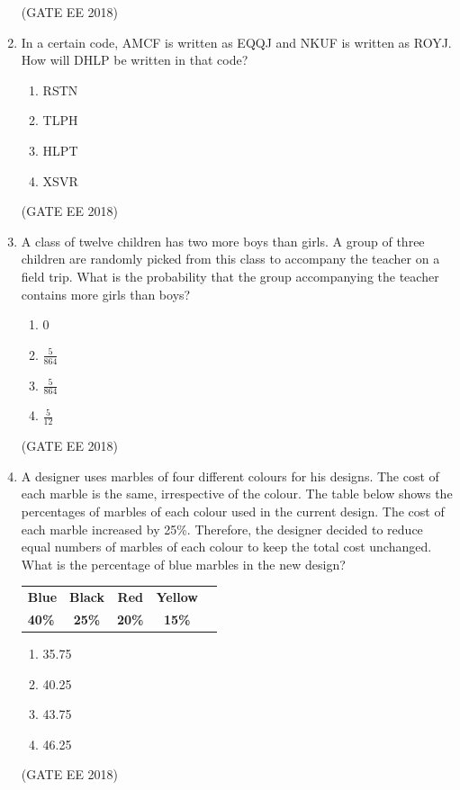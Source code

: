 \documentclass[journal,12pt,onecolumn]{IEEEtran}
\theoremstyle{remark}
\begin{document}
\begin{enumerate}
    \hfill{(GATE EE 2018)}
    \item In a certain code, AMCF is written as EQQJ and NKUF is written as ROYJ. How will DHLP be written in that code?
    \begin{multicols}{4}
    \begin{enumerate}
        \item RSTN
        \item TLPH
        \item HLPT
        \item XSVR
    \end{enumerate}
    \end{multicols}
     \hfill{(GATE EE 2018)}
    
    \item A class of twelve children has two more boys than girls. A group of three children are randomly picked from this class to accompany the teacher on a field trip. What is the probability that the group accompanying the teacher contains more girls than boys?
    \begin{multicols}{4}
    \begin{enumerate}
        \item 0
        \item $\frac{5}{864}$
        \item $\frac{5}{864}$
        \item $\frac{5}{12}$
    \end{enumerate}
    \end{multicols}
     \hfill{(GATE EE 2018)}
    
    \item A designer uses marbles of four different colours for his designs. The cost of each marble is the same, irrespective of the colour. The table below shows the percentages of marbles of each colour used in the current design. The cost of each marble increased by 25\%. Therefore, the designer decided to reduce equal numbers of marbles of each colour to keep the total cost unchanged. What is the percentage of blue marbles in the new design?
    \begin{center}
        \begin{tabular}{|l|c|c|c|c|}
            \hline
            \textbf{Blue} & \textbf{Black} & \textbf{Red} & \textbf{Yellow} \\
            \textbf{40\%} & \textbf{25\%} & \textbf{20\%} & \textbf{15\%} \\
            \hline
        \end{tabular}
    \end{center}
    \begin{multicols}{4}
    \begin{enumerate}
        \item 35.75
        \item 40.25
        \item 43.75
        \item 46.25
    \end{enumerate}
    \end{multicols}
    \hfill{(GATE EE 2018)}
    

\end{enumerate}
\end{document}
